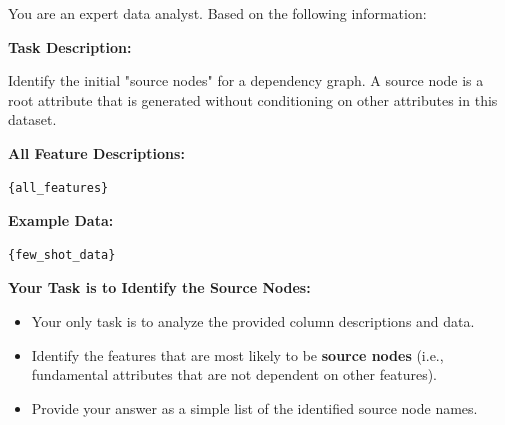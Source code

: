 \begin{tcolorbox}[
    float*=t, width=\textwidth, floatplacement=htbp,
    colback=yellow!10!white,  %
    colframe=yellow!75!black, %
    title={Prompt for Source Nodes Initialization of Tabular Data ($\pi_\mathtt{source}$)}, %
    fonttitle=\bfseries\color{white}, %
    arc=2mm, %
    boxrule=1pt %
]
\small %

You are an expert data analyst. Based on the following information:

\vspace{\medskipamount}

\textbf{Task Description:}

Identify the initial "source nodes" for a dependency graph. A source node is a root attribute that is generated without conditioning on other attributes in this dataset.


\vspace{\medskipamount}

\textbf{All Feature Descriptions:}
\begin{verbatim}
{all_features}
\end{verbatim}

\vspace{\medskipamount}

\textbf{Example Data:}
\begin{verbatim}
{few_shot_data}
\end{verbatim}

\vspace{\medskipamount}

\textbf{Your Task is to Identify the Source Nodes:}
\begin{itemize}[leftmargin=*, itemsep=2pt]
    \item Your only task is to analyze the provided column descriptions and data.
    \item Identify the features that are most likely to be \textbf{source nodes} (i.e., fundamental attributes that are not dependent on other features).
    \item Provide your answer as a simple list of the identified source node names.
\end{itemize}
\label{prompt:source}
\end{tcolorbox}



